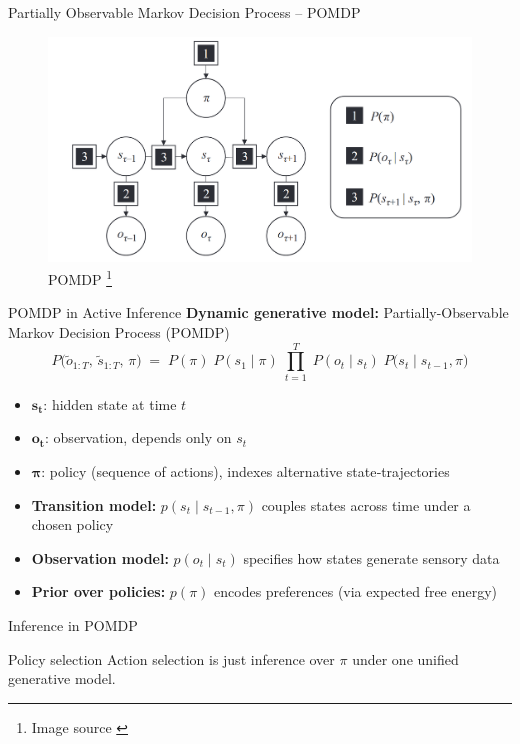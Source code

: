 \documentclass[aspectratio=1610, english]{beamer}
\begin{document}
\begin{frame}{Partially Observable Markov Decision Process -- POMDP}
    \begin{figure}
        \centering
        \includegraphics[width=1.0\linewidth]{img/pomd_graphical_model.png}
        \caption{POMDP \footnote{Image source \cite{active-inference-book}}}
        \label{fig:pomd}
    \end{figure}
\end{frame}

\begin{frame}{POMDP in Active Inference}
  \textbf{Dynamic generative model:} Partially-Observable Markov Decision Process (POMDP)
  \[
  P\bigl(\tilde o_{1:T},\,\tilde s_{1:T},\,\pi\bigr)
    \;=\;P(\pi)\;P(s_1\mid\pi)\;\prod_{t=1}^T
       \;P(o_t\mid s_t)\;P\bigl(s_t\mid s_{t-1},\pi\bigr)
\]
  \medskip
  \begin{itemize}
    \item \(\mathbf{s_t}\): hidden state at time \(t\)  
    \item \(\mathbf{o_t}\): observation, depends only on \(s_t\)  
    \item \(\boldsymbol\pi\): policy (sequence of actions), indexes alternative state‐trajectories  
    \item \textbf{Transition model:} \(p(s_t\mid s_{t-1},\pi)\) couples states across time under a chosen policy  
    \item \textbf{Observation model:} \(p(o_t\mid s_t)\) specifies how states generate sensory data  
    \item \textbf{Prior over policies:} \(p(\pi)\) encodes preferences (via expected free energy)  
  \end{itemize}
\end{frame}

\begin{frame}{Inference in POMDP}
    \begin{block}{Policy selection}
        Action selection is just inference over \(\pi\) under one unified generative model.
    \end{block}
\end{frame}
\end{document}
